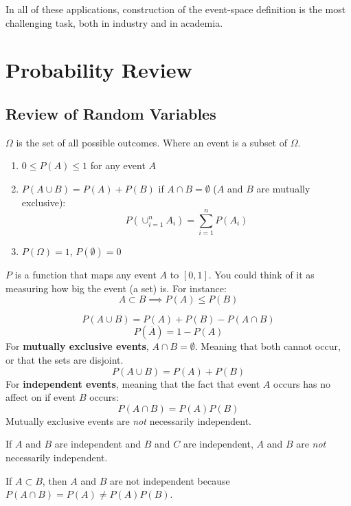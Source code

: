 \documentclass{report}
\newcommand{\n}[1]{\overline{#1}}
\begin{document}
In all of these applications, construction of the event-space definition is the most challenging task, both in industry and in academia. 









\section{Probability Review}

\subsection{Review of Random Variables}

$\Omega$ is the set of all possible outcomes. Where an event is a subset of $\Omega$. \begin{enumerate}
\item $0 \leq P(A) \leq 1$ for any event $A$
\item $P(A \cup B) = P(A) + P(B)$ if $A \cap B = \emptyset$ ($A$ and $B$ are mutually exclusive): $$ P(\cup_{i=1}^n A_i) = \sum_{i=1}^n P(A_i)$$
\item $P(\Omega) = 1$, $P(\emptyset) = 0$
\end{enumerate}

$P$ is a function that maps any event $A$ to $[0,1]$. You could think of it as measuring how big the event (a set) is. For instance: $$A \subset B \implies P(A) \leq P(B)$$

$$P(A \cup B) = P(A) + P(B) - P(A \cap B)$$
$$P(\n{A}) = 1 - P(A)$$
For \textbf{mutually exclusive events}, $A \cap B = \emptyset$. Meaning that both cannot occur, or that the sets are disjoint. $$P(A \cup B) = P(A) + P(B)$$
For \textbf{independent events}, meaning that the fact that event $A$ occurs has no affect on if event $B$ occurs: $$P(A \cap B) = P(A)P(B)$$
Mutually exclusive events are \textit{not} necessarily independent.

If $A$ and $B$ are independent and $B$ and $C$ are independent, $A$ and $B$ are \textit{not} necessarily independent.

If $A \subset B$, then $A$ and $B$ are not independent because $P(A \cap B) = P(A) \neq P(A)P(B)$. 
\end{document}
